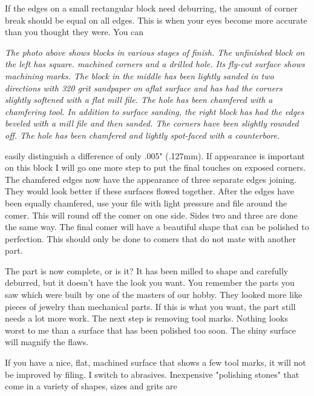 
If the edges on a small rectangular block need deburring, the amount of corner
break should be equal on all edges. This is when your eyes become more accurate
than you thought they were. You can

\bigskip
\textit{The photo above shows blocks in various stages of finish. The unfinished
block on the left has square. machined corners and a drilled hole. Its fly-cut
surface shows machining marks. The block in the middle has been lightly sanded
in two directions with 320 grit sandpaper on aflat surface and has had the
corners slightly softened with a flat mill file. The hole has been chamfered
with a chamfering tool. In addition to surface sanding, the right block has had
the edges beveled with a mill file and then sanded. The corners have been
slightly rounded off. The hole has been chamfered and lightly spot-faced with a
counterbore.}
\bigskip

easily distinguish a difference of only .005" (.127mm). If appearance is
important on this block I will go one more step to put the final touches on
exposed corners. The chamfered edges now have the appearance of three separate
edges joining. They would look better if these surfaces flowed together. After
the edges have been equally chamfered, use your file with light pressure and
file around the comer. This will round off the comer on one side. Sides two and
three are done the same way. The final comer will have a beautiful shape that
can be polished to perfection. This should only be done to comers that do not
mate with another part.


The part is now complete, or is it? It has been milled to shape and carefully
deburred, but it doesn't have the look you want. You remember the parts you saw
which were built by one of the masters of our hobby. They looked more like
pieces of jewelry than mechanical parts. If this is what you want, the part
still needs a lot more work. The next step is removing tool marks. Nothing looks
worst to me than a surface that has been polished too soon. The shiny surface
will magnify the flaws.


If you have a nice, flat, machined surface that shows a few tool marks, it will
not be improved by filing. I switch to abrasives. Inexpensive "polishing stones"
that come in a variety of shapes, sizes and grits are

